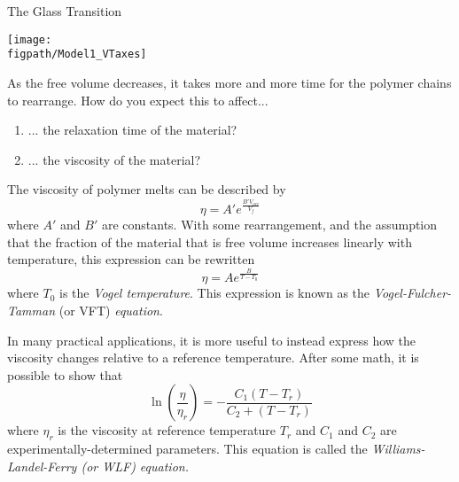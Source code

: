 \begin{activity}{The Glass Transition}
\begin{ctqs}
		\vspace{0.25in}
		\centerline{\texttt{[image: \\figpath/Model1\_VTaxes]}}
		
	\question As the free volume decreases, it takes more and more time for the polymer chains to rearrange.  How do you expect this to affect... \label{\labelbase:ctq:viscosityconcept}
	
		\begin{enumerate}
			\item ... the relaxation time of the material?
			
				\begin{solution}[0.5in]
				\end{solution}
			
			\item ... the viscosity of the material?
			
				\begin{solution}[0.5in]
				\end{solution}
				
		\end{enumerate}
	
\end{ctqs}

\begin{infobox}

	The viscosity of polymer melts can be described by
	\begin{equation*}
		\eta = A' e^{\frac{B' V_{occ}}{V_f}}
	\end{equation*}
	where $A'$ and $B'$ are constants.  With some rearrangement, and the assumption that the fraction of the material that is free volume increases linearly with temperature, this expression can be rewritten
	\begin{equation*}
		\eta = A e^{\frac{B}{T-T_0}}
	\end{equation*}
	where $T_0$ is the \emph{Vogel temperature}.  This expression is known as the \emph{Vogel-Fulcher-Tamman} (or VFT) \emph{equation}.
	
	In many practical applications, it is more useful to instead express how the viscosity changes relative to a reference temperature.  After some math, it is possible to show that
	\begin{equation*}
		\ln\left(\frac{\eta}{\eta_r}\right) = -\frac{C_1(T-T_r)}{C_2 + (T-T_r)}
	\end{equation*}
	where $\eta_r$ is the viscosity at reference temperature $T_r$ and $C_1$ and $C_2$ are experimentally-determined parameters.  This equation is called the \emph{Williams-Landel-Ferry \emph{(or WLF)} equation.}
			

\end{infobox}
\end{activity}
